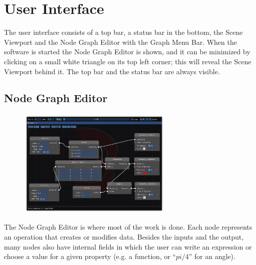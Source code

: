 \chapter{User Interface}

The user interface consists of a top bar, a status bar in the bottom,
the Scene Viewport and the Node Graph Editor with the Graph Menu Bar.
When the software is started the Node Graph Editor is shown, and it can be
minimized by clicking on a small white triangle on its top left corner;
this will reveal the Scene Viewport behind it. The top bar and the status bar are
always visible.

\section{Node Graph Editor}
\label{section:node_editor}

\begin{figure}[H]
\centering
\includegraphics[width=0.666\textwidth]{figures/graph_editor.png}
\end{figure}
The Node Graph Editor is where most of the work is done.
Each node represents an operation that creates or modifies data. Besides the inputs and
the output, many nodes also have internal fields in which the user can write an expression
or choose a value for a given property (e.g. a function, or ``$pi/4$'' for an angle).

